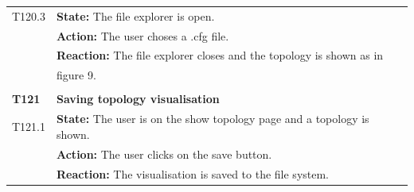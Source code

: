 \documentclass[parskip=full]{scrartcl}
\begin{document}
\begin{tabular}{p{2cm}p{11.4cm}}
T120.3 & \textbf{State:} The file explorer is open.\\
& \textbf{Action:} The user choses a .cfg file.\\
& \textbf{Reaction:} The file explorer closes and the topology is shown as in \\
& figure 9. \\
& \\
\textbf{T121} \hypertarget{T121}& \textbf{Saving topology visualisation}\\
T121.1 & \textbf{State:} The user is on the show topology page and a topology is shown.\\
& \textbf{Action:} The user clicks on the save button.\\
& \textbf{Reaction:} The visualisation is saved to the file system.\\
\end{tabular}
\newpage
\end{document}
